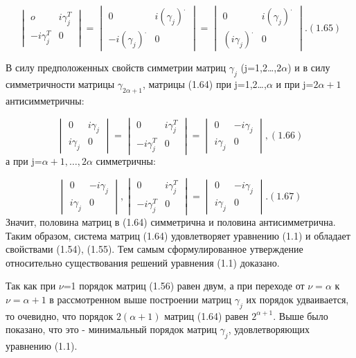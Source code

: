 \documentclass{article}
\begin{document}
{$$\begin{vmatrix}
o & i\gamma^{T}_j\\
-i\gamma^{T}_j & 0
\end{vmatrix}=
\begin{vmatrix}
0 & i(\gamma_j)^{.}\\
-i(\gamma_j)^{.} & 0
\end{vmatrix}=
\begin{vmatrix}
0 & i(\gamma_j)^{.}\\
(i\gamma_j)^{.} & 0
\end{vmatrix}.(1.65)
 $$
 \par
В силу предположенных свойств симметрии матриц $\gamma_j$ (j=1,2\dots,$2\alpha$) и в силу симметричности матрицы $\gamma_{2\alpha+1}$, матрицы (1.64) при j=1,2\dots,$\alpha$ и при j=$2\alpha+1$ антисимметричны:\par
$$
\begin{vmatrix}
0 & i\gamma_j\\
i\gamma_j & 0
\end{vmatrix}=
\begin{vmatrix}
0 & i\gamma^{T}_j\\
-i\gamma^{T}_j & 0
\end{vmatrix}=
\begin{vmatrix}
0 & -i\gamma_j\\
i\gamma_j & 0
\end{vmatrix},(1.66)
$$
а при j=$\alpha+1,\dots,2\alpha$ симметричны:\par
$$
\begin{vmatrix}
0 & -i\gamma_j\\
i\gamma_j & 0
\end{vmatrix},
\begin{vmatrix}
0 & i\gamma^{T}_j\\
-i\gamma^{T}_j & 0
\end{vmatrix}=
\begin{vmatrix}
0 & -i\gamma_j\\
i\gamma_j & 0
\end{vmatrix}. (1.67)$$
Значит, половина матриц в (1.64) симметрична и половина антисимметрична. Таким образом, система матриц (1.64) удовлетворяет уравнению (1.1) и обладает свойствами (1.54), (1.55). Тем самым сформулированное утверждение относительно существования решений уравнения (1.1) доказано.\par
Так как при $\nu$=1 порядок матриц (1.56) равен двум, а при переходе от $\nu=\alpha$ к $\nu=\alpha+1$  в рассмотренном выше построении матриц $\gamma_j$ их порядок удваивается, то очевидно, что порядок $2(\alpha+1)$ матриц (1.64) равен $2^{\alpha+1}$. Выше было показано, что это - минимальный порядок матриц $\gamma_j$, удовлетворяющих уравнению (1.1).\par
}
\end{document}
